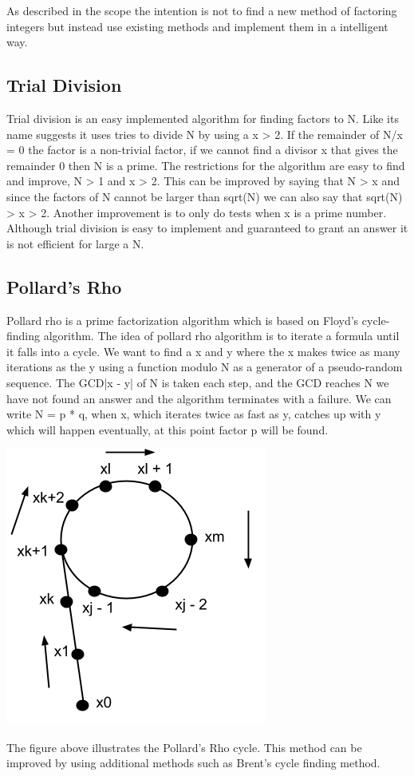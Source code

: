 As described in the scope the intention is not to find a new method of factoring integers but instead use existing methods and implement them in a intelligent way.

\subsection{Trial Division}
Trial division is an easy implemented algorithm for finding factors to N. Like its name suggests it uses tries to divide N by using a x > 2. If the remainder of N/x = 0 the factor is a non-trivial factor, if we cannot find a divisor x that gives the remainder 0 then N is a prime.
The restrictions for the algorithm are easy to find and improve, N > 1 and x > 2. This can be improved by saying that N > x and since the factors of N cannot be larger than sqrt(N) we can also say that sqrt(N) > x > 2. Another improvement is to only do tests when x is a prime number. Although trial division is easy to implement and guaranteed to grant an answer it is not efficient for large a N.

\subsection{Pollard's Rho}
Pollard rho is a prime factorization algorithm which is based on Floyd’s cycle-finding algorithm. The idea of pollard rho algorithm is to iterate a formula until it falls into a cycle. We want to find a x and y where the x makes twice as many iterations as the y using a function modulo N as a generator of a pseudo-random sequence. The GCD|x - y| of N is taken each step, and the GCD reaches N we have not found an answer and the algorithm terminates with a failure.
We can write N = p * q, when x, which iterates twice as fast as y, catches up with y which will happen eventually, at this point factor p will be found. \cite{avalg}

\includegraphics[scale = 0.5]{pollards.png}

The figure above illustrates the Pollard's Rho cycle. This method can be improved by using additional methods such as Brent's cycle finding method.